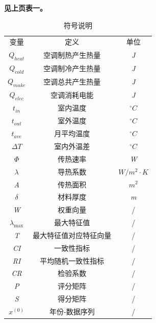 \documentclass[a4paper, 12pt]{article}
\numberwithin{equation}{section}
\begin{document}
    {}
        \textbf{见上页表一。}
        \begin{table}[htbp]
            \centering
            \caption{符号说明}
            \begin{tabular}{c c c}
                \hline \hline \noalign{\smallskip}
                变量 & 定义 & 单位 \\
                \noalign{\smallskip} \hline \noalign{\smallskip}
                $ Q_{heat} $ & 空调制热产生热量 & \textit{J} \\
                $ Q_{cold} $ & 空调制冷产生热量 & \textit{J} \\
                $ Q_{make} $ & 空调总共产生热量 & \textit{J} \\
                $ Q_{elec} $ & 空调消耗电能 & \textit{J} \\
                $ t_{in} $ & 室内温度 & $ ^{\circ}C $ \\
                $ t_{out} $ & 室外温度 & $ ^{\circ}C $ \\
                $ t_{ave} $ & 月平均温度 & $ ^{\circ}C $ \\
                $ \Delta T $ & 室内外温差 & $ ^{\circ}C $ \\
                $ \Phi $ & 传热速率 & \textit{W} \\
                $ \lambda $ & 导热系数 & $ W / m^{2} \cdot K $ \\
                \textit{A} & 传热面积 & $ m^{2} $ \\
                $ \delta $ & 材料厚度 & \textit{m} \\
                \textit{W} & 权重向量 & / \\
                $ \lambda _{\max} $ & 最大特征值 & / \\
                \textit{T} & 最大特征值对应特征向量 & / \\
                \textit{CI} & 一致性指标 & / \\
                \textit{RI} & 平均随机一致性指标 & / \\
                \textit{CR} & 检验系数 & / \\
                \textit{P} & 评分矩阵 & / \\
                \textit{S} & 得分矩阵 & / \\
                $ x^{ (0)} $ & 年份-数据序列 & / \\

\end{tabular}
\end{table}
\end{document}

